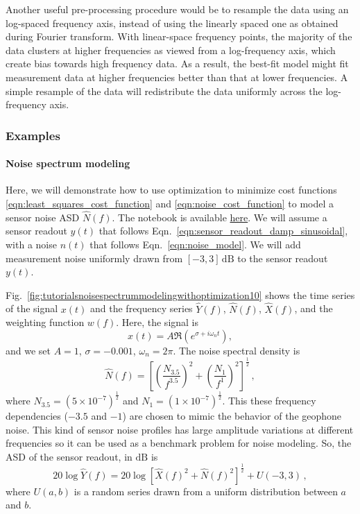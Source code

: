 Another useful pre-processing procedure would be to resample the data using an log-spaced frequency axis, instead of using the linearly spaced one as obtained during Fourier transform.
With linear-space frequency points, the majority of the data clusters at higher frequencies as viewed from a log-frequency axis, which create bias towards high frequency data.
As a result, the best-fit model might fit measurement data at higher frequencies better than that at lower frequencies.
A simple resample of the data will redistribute the data uniformly across the log-frequency axis.

\subsubsection{Examples \label{sec:curve_fitting_examples}}
\paragraph{Noise spectrum modeling}
Here, we will demonstrate how to use optimization to minimize cost functions \eqref{eqn:least_squares_cost_function} and \eqref{eqn:noise_cost_function} to model a sensor noise ASD $\hat{N}(f)$.
The notebook is available \href{https://kontrol.readthedocs.io/en/latest/tutorials/noise_spectrum_modeling_with_optimization.html}{here}.
We will assume a sensor readout $y(t)$ that follows Eqn.~\eqref{eqn:sensor_readout_damp_sinusoidal}, with a noise $n(t)$ that follows Eqn.~\eqref{eqn:noise_model}.
We will add measurement noise uniformly drawn from $[-3, 3]\,\mathrm{dB}$ to the sensor readout $y(t)$.

Fig.~\ref{fig:tutorialsnoisespectrummodelingwithoptimization10} shows the time series of the signal $x(t)$ and the frequency series $\hat{Y}(f)$, $\hat{N}(f)$, $\hat{X}(f)$, and the weighting function $w(f)$.
Here, the signal is
\begin{equation}
	x(t) = A\Re{\left(e^{\sigma+i\omega_n t}\right)},
\end{equation}
and we set $A=1$, $\sigma=-0.001$, $\omega_n=2\pi$.
The noise spectral density is
\begin{equation}
	\hat{N}(f) = \left[\left(\frac{N_{3.5}}{f^{3.5}}\right)^2+\left(\frac{N_1}{f^1}\right)^2\right]^\frac{1}{2}\,,
\end{equation}
where $N_{3.5}=\left(5\times10^{-7}\right)^\frac{1}{2}$ and $N_1=\left(1\times10^{-7}\right)^\frac{1}{2}$.
This these frequency dependencies ($-3.5$ and $-1$) are chosen to mimic the behavior of the geophone noise.
This kind of sensor noise profiles has large amplitude variations at different frequencies so it can be used as a benchmark problem for noise modeling.
So, the ASD of the sensor readout, in $\mathrm{dB}$ is
\begin{equation}
	20\log\hat{Y}(f) = 20\log\left[\hat{X}(f)^2 + \hat{N}(f)^2\right]^\frac{1}{2} + U(-3, 3)\,,
\end{equation}
where $U(a,b)$ is a random series drawn from a uniform distribution between $a$ and $b$.

